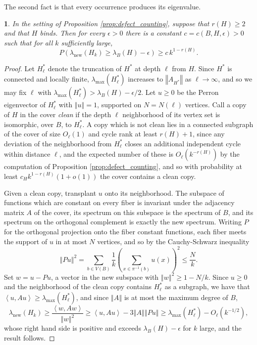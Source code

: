 \documentclass[12pt,oneside,english]{amsart}
\numberwithin{equation}{section}
\numberwithin{figure}{section}
\numberwithin{table}{section}
\theoremstyle{plain}
\numberwithin{thm}{section}
\theoremstyle{plain}
\newtheorem{prop}[thm]{\protect\propositionname}
\theoremstyle{plain}
\theoremstyle{plain}
\theoremstyle{definition}
\theoremstyle{definition}
\theoremstyle{definition}
\theoremstyle{remark}
\providecommand{\propositionname}{Proposition}
\begin{document}
The second fact is that every occurrence produces its eigenvalue.
\begin{prop}
\label{prop:defect_eigenvalue}In the setting of Proposition \ref{prop:defect_counting},
suppose that $r(H)\geq2$ and that $H$ binds. Then for every $\epsilon>0$
there is a constant $c=c(B,H,\epsilon)>0$ such that for all $k$ sufficiently
large,
\[
P\left(\lambda_{\mathrm{new}}(H_{k})\geq\lambda_{B}(H)-\epsilon\right)\geq c\,k^{1-r(H)}.
\]
\end{prop}
\begin{proof}
Let $H_{\ell}^{*}$ denote the truncation of $H^{*}$ at depth $\ell$
from $H$. Since $H^{*}$ is connected and locally finite, $\lambda_{\max}(H_{\ell}^{*})$
increases to $\left\Vert A_{H^{*}}\right\Vert $ as $\ell\rightarrow\infty$,
and so we may fix $\ell$ with $\lambda_{\max}(H_{\ell}^{*})>\lambda_{B}(H)-\epsilon/2$.
Let $u\geq0$ be the Perron eigenvector of $H_{\ell}^{*}$ with $\left\Vert u\right\Vert =1$,
supported on $N=N(\ell)$ vertices. Call a copy of $H$ in the cover
\emph{clean} if the depth $\ell$ neighborhood of its vertex set is
isomorphic, over $B$, to $H_{\ell}^{*}$. A copy which is not clean
lies in a connected subgraph of the cover of size $O_{\ell}(1)$ and
cycle rank at least $r(H)+1$, since any deviation of the neighborhood
from $H_{\ell}^{*}$ closes an additional independent cycle within
distance $\ell$, and the expected number of these is $O_{\ell}(k^{-r(H)})$
by the computation of Proposition \ref{prop:defect_counting}, and
so with probability at least $c_{H}k^{1-r(H)}\left(1+o(1)\right)$
the cover contains a clean copy.

Given a clean copy, transplant $u$ onto its neighborhood. The subspace
of functions which are constant on every fiber is invariant under
the adjacency matrix $A$ of the cover, its spectrum on this subspace
is the spectrum of $B$, and its spectrum on the orthogonal complement
is exactly the new spectrum. Writing $P$ for the orthogonal projection
onto the fiber constant functions, each fiber meets the support of
$u$ in at most $N$ vertices, and so by the Cauchy-Schwarz inequality
\[
\left\Vert Pu\right\Vert ^{2}=\sum_{b\in V(B)}\frac{1}{k}\left(\sum_{x\in\pi^{-1}(b)}u(x)\right)^{2}\leq\frac{N}{k}.
\]
Set $w=u-Pu$, a vector in the new subspace with $\left\Vert w\right\Vert ^{2}\geq1-N/k$.
Since $u\geq0$ and the neighborhood of the clean copy contains $H_{\ell}^{*}$
as a subgraph, we have that $\left\langle u,Au\right\rangle \geq\lambda_{\max}(H_{\ell}^{*})$,
and since $\left\Vert A\right\Vert $ is at most the maximum degree
of $B$,
\[
\lambda_{\mathrm{new}}(H_{k})\geq\frac{\left\langle w,Aw\right\rangle }{\left\Vert w\right\Vert ^{2}}\geq\left\langle u,Au\right\rangle -3\left\Vert A\right\Vert \left\Vert Pu\right\Vert \geq\lambda_{\max}(H_{\ell}^{*})-O_{\ell}\left(k^{-1/2}\right),
\]
whose right hand side is positive and exceeds $\lambda_{B}(H)-\epsilon$
for $k$ large, and the result follows.
\end{proof}
\end{document}
